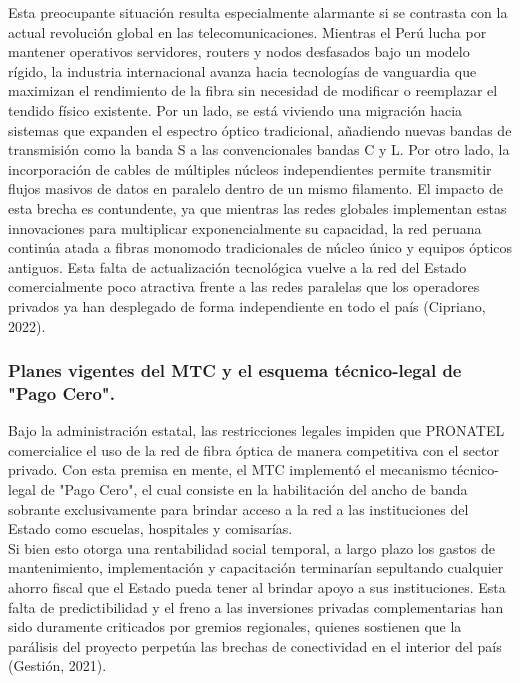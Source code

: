 Esta preocupante situación resulta especialmente alarmante si se contrasta con la actual revolución global en las telecomunicaciones. 
Mientras el Perú lucha por mantener operativos servidores, routers y nodos desfasados bajo un modelo rígido, la industria internacional 
avanza hacia tecnologías de vanguardia que maximizan el rendimiento de la fibra sin necesidad de modificar o reemplazar el tendido físico 
existente. Por un lado, se está viviendo una migración hacia sistemas que expanden el espectro óptico tradicional, añadiendo nuevas bandas 
de transmisión como la banda S a las convencionales bandas C y L. Por otro lado, la incorporación de cables de múltiples núcleos independientes 
permite transmitir flujos masivos de datos en paralelo dentro de un mismo filamento. El impacto de esta brecha es contundente, 
ya que mientras las redes globales implementan estas innovaciones para multiplicar exponencialmente su capacidad, la red peruana continúa atada a 
fibras monomodo tradicionales de núcleo único y equipos ópticos antiguos. Esta falta de actualización tecnológica vuelve a la red del Estado 
comercialmente poco atractiva frente a las redes paralelas que los operadores privados ya han desplegado de forma independiente en todo el país 
(Cipriano, 2022).

\subsubsection{Planes vigentes del MTC y el esquema técnico-legal de "Pago Cero".}

Bajo la administración estatal, las restricciones legales impiden que PRONATEL comercialice el uso de la red de fibra
óptica de manera competitiva con el sector privado. Con esta premisa en mente, el MTC implementó el mecanismo técnico-legal de "Pago Cero", 
el cual consiste en la habilitación del ancho de banda sobrante exclusivamente para brindar acceso a la red a las instituciones del Estado como escuelas, hospitales y comisarías.\\

Si bien esto otorga una rentabilidad social temporal, a largo plazo los gastos de mantenimiento, implementación y 
capacitación terminarían sepultando cualquier ahorro fiscal que el Estado pueda tener al brindar apoyo a sus instituciones. Esta falta de predictibilidad y el freno a las 
inversiones privadas complementarias han sido duramente criticados por gremios regionales, quienes sostienen que la parálisis del proyecto perpetúa las brechas de conectividad en el interior del país (Gestión, 2021). 

